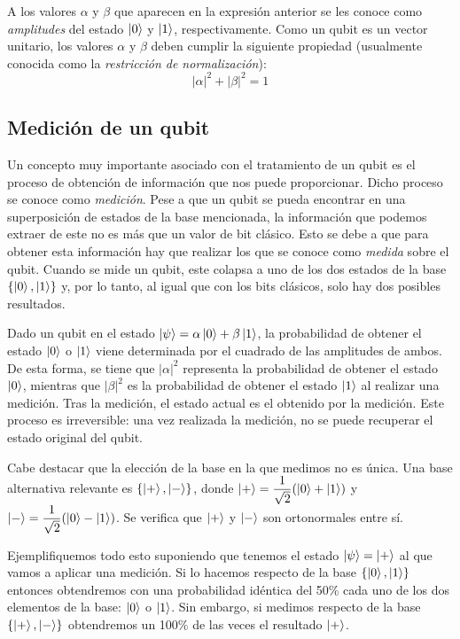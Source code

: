 A los valores $\alpha$ y $\beta$ que aparecen en la expresión anterior se les conoce como \textit{amplitudes} del estado $\left|0\right\rangle$ y $\left|1\right\rangle$, respectivamente. Como un qubit es un vector unitario, los valores $\alpha$ y $\beta$ deben cumplir 
la siguiente propiedad (usualmente conocida como la \textit{restricción de normalización}):
$$|\alpha|^2 + |\beta|^2 = 1
$$

\subsection{Medición de un qubit}
Un concepto muy importante asociado con el tratamiento de un qubit es el proceso de obtención de información que nos puede proporcionar. Dicho proceso se conoce como \textit{medición}. Pese a que un qubit se pueda encontrar en una superposición de estados de la base mencionada, la información que podemos extraer de este no es más que un valor de bit clásico. Esto se debe a que para obtener esta información hay que realizar los que se conoce como \textit{medida} sobre el qubit. Cuando se mide un qubit, este colapsa a uno de los dos estados de la base $\{\left|0\right\rangle,\left|1\right\rangle\}$ y, por lo tanto, al igual que con los bits clásicos, solo hay dos posibles resultados.

Dado un qubit en el estado $\left|\psi\right\rangle=\alpha\left|0\right\rangle+\beta\left|1\right\rangle$, la probabilidad de obtener el estado $\left|0\right\rangle$ o $\left|1\right\rangle$ viene determinada por el cuadrado de las amplitudes de ambos. De esta forma, se tiene que $|\alpha|^2$ representa la probabilidad de obtener el estado $\left|0\right\rangle$, mientras que $|\beta|^2$ es la probabilidad de obtener el estado $\left|1\right\rangle$ al realizar una medición. Tras la medición, el estado actual es el obtenido por la medición. Este proceso es irreversible: una vez realizada la medición, no se puede recuperar el estado original del qubit. 

Cabe destacar que la elección de la base en la que medimos no es única. Una base alternativa relevante es $\{\left|+\right\rangle,\left|-\right\rangle\}$, donde $\left|+\right\rangle=\dfrac{1}{\sqrt{2}}(\left|0\right\rangle+\left|1\right\rangle)$ y $\left|-\right\rangle=\dfrac{1}{\sqrt{2}}(\left|0\right\rangle-\left|1\right\rangle)$. Se verifica que $\left|+\right\rangle$ y $\left|-\right\rangle$ son ortonormales entre sí.

Ejemplifiquemos todo esto suponiendo que tenemos el estado $\left|\psi\right\rangle=\left|+\right\rangle$ al que vamos a aplicar una medición. Si lo hacemos respecto de la base $\{\left|0\right\rangle,\left|1\right\rangle\}$ entonces obtendremos con una probabilidad idéntica del 50\% cada uno de los dos elementos de la base: $\left|0\right\rangle$ o $\left|1\right\rangle$. Sin embargo, si medimos respecto de la base $\{\left|+\right\rangle,\left|-\right\rangle\}$ obtendremos un 100\% de las veces el resultado $\left|+\right\rangle$. 

